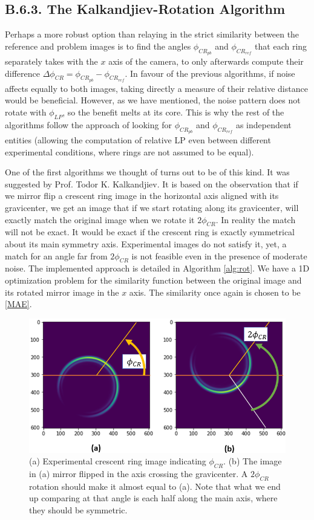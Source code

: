 \documentclass[11pt, a4paper, twoside]{article} %
\begin{document}
\subsection*{B.6.3. The Kalkandjiev-Rotation Algorithm}\vspace{-0.15cm}
Perhaps a more robust option than relaying in the strict similarity between the reference and problem images is to find the angles $\phi_{CR_{pb}}$ and $\phi_{CR_{ref}}$ that each ring separately takes with the $x$ axis of the camera, to only afterwards compute their difference $\Delta \phi_{CR}=\phi_{CR_{pb}}-\phi_{CR_{ref}}$. In favour of the previous algorithms, if noise affects equally to both images, taking directly a measure of their relative distance would be beneficial. However, as we have mentioned, the noise pattern does not rotate with $\phi_{LP}$, so the benefit melts at its core. This is why the rest of the algorithms follow the approach of looking for $\phi_{CR_{pb}}$ and $\phi_{CR_{ref}}$ as independent entities (allowing the computation of relative LP even between different experimental conditions, where rings are not assumed to be equal).

One of the first algorithms we thought of turns out to be of this kind. It was suggested by Prof. Todor K. Kalkandjiev. It is based on the observation that if we mirror flip a crescent ring image in the horizontal axis aligned with its gravicenter, we get an image that if we start rotating along its gravicenter, will exactly match the original image when we rotate it $2\phi_{CR}$. In reality the match will not be exact. It would be exact if the crescent ring is exactly symmetrical about its main symmetry axis. Experimental images do not satisfy it, yet, a match for an angle far from $2\phi_{CR}$ is not feasible even in the presence of moderate noise. The implemented approach is detailed in Algorithm \ref{alg:rot}. We have a 1D optimization problem for the similarity function between the original image and its rotated mirror image in the $x$ axis. The similarity once again is chosen to be \eqref{MAE}.

\begin{figure}[h!] 
     \centering 
    \includegraphics[width=0.65\linewidth]{rot.PNG}
    \caption{(a) Experimental crescent ring image indicating $\phi_{CR}$. (b) The image in (a) mirror flipped in the axis crossing the gravicenter. A $2\phi_{CR}$ rotation should make it almost equal to (a). Note that what we end up comparing at that angle is each half along the main axis, where they should be symmetric. \vspace{-0.1cm}}
    \label{fig:kalk}
\end{figure}
\end{document}
